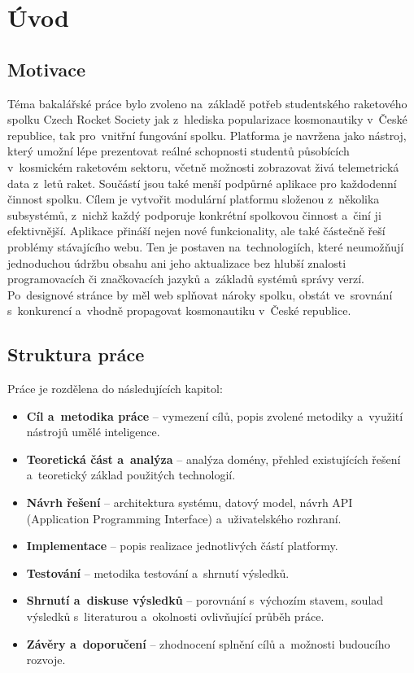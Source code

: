 \chapter{Úvod}

\section{Motivace}
Téma bakalářské práce bylo zvoleno na~základě potřeb studentského raketového spolku Czech Rocket Society jak z~hlediska popularizace kosmonautiky v~České republice, tak pro~vnitřní fungování spolku.
Platforma je navržena jako nástroj, který umožní lépe prezentovat reálné schopnosti studentů působících v~kosmickém raketovém sektoru, včetně možnosti zobrazovat živá telemetrická data z~letů raket. Součástí jsou také menší podpůrné aplikace pro každodenní činnost spolku.
Cílem je vytvořit modulární platformu složenou z~několika subsystémů, z~nichž každý podporuje konkrétní spolkovou činnost a~činí ji efektivnější.
Aplikace přináší nejen nové funkcionality, ale také částečně řeší problémy stávajícího webu. Ten je postaven na~technologiích, které neumožňují jednoduchou údržbu obsahu ani jeho aktualizace bez hlubší znalosti programovacích či značkovacích jazyků a~základů systémů správy verzí.
Po~designové stránce by měl web splňovat nároky spolku, obstát ve~srovnání s~konkurencí a~vhodně propagovat kosmonautiku v~České republice.

\section{Struktura práce}
Práce je rozdělena do následujících kapitol:
\begin{itemize}
    \item \textbf{Cíl a~metodika práce} -- vymezení cílů, popis zvolené metodiky a~využití nástrojů umělé inteligence.
    \item \textbf{Teoretická část a~analýza} -- analýza domény, přehled existujících řešení a~teoretický základ použitých technologií.
    \item \textbf{Návrh řešení} -- architektura systému, datový model, návrh API (Application Programming Interface) a~uživatelského rozhraní.
    \item \textbf{Implementace} -- popis realizace jednotlivých částí platformy.
    \item \textbf{Testování} -- metodika testování a~shrnutí výsledků.
    \item \textbf{Shrnutí a~diskuse výsledků} -- porovnání s~výchozím stavem, soulad výsledků s~literaturou a~okolnosti ovlivňující průběh práce.
    \item \textbf{Závěry a~doporučení} -- zhodnocení splnění cílů a~možnosti budoucího rozvoje.
\end{itemize}